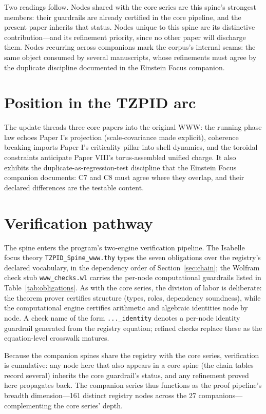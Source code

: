 \documentclass[11pt]{article}
\theoremstyle{remark}
\begin{document}
Two readings follow. Nodes shared with the core series are this spine's strongest members: their guardrails are already certified in the core pipeline, and the present paper inherits that status. Nodes unique to this spine are its distinctive contribution---and its refinement priority, since no other paper will discharge them. Nodes recurring across companions mark the corpus's internal seams: the same object consumed by several manuscripts, whose refinements must agree by the duplicate discipline documented in the Einstein Focus companion.

\section{Position in the TZPID arc}
\label{sec:arc}

The update threads three core papers into the original WWW: the running phase law echoes Paper I's projection (scale-covariance made explicit), coherence breaking imports Paper I's criticality pillar into shell dynamics, and the toroidal constraints anticipate Paper VIII's torus-assembled unified charge. It also exhibits the duplicate-as-regression-test discipline that the Einstein Focus companion documents: C7 and C8 must agree where they overlap, and their declared differences are the testable content.

\section{Verification pathway}
\label{sec:verify}

The spine enters the program's two-engine verification pipeline. The Isabelle focus theory \texttt{TZPID\_Spine\_www.thy} types the seven obligations over the registry's declared vocabulary, in the dependency order of Section~\ref{sec:chain}; the Wolfram check stub \texttt{www\_checks.wl} carries the per-node computational guardrails listed in Table~\ref{tab:obligations}. As with the core series, the division of labor is deliberate: the theorem prover certifies structure (types, roles, dependency soundness), while the computational engine certifies arithmetic and algebraic identities node by node. A check name of the form \texttt{...\_identity} denotes a per-node identity guardrail generated from the registry equation; refined checks replace these as the equation-level crosswalk matures.

Because the companion spines share the registry with the core series, verification is cumulative: any node here that also appears in a core spine (the chain tables record several) inherits the core guardrail's status, and any refinement proved here propagates back. The companion series thus functions as the proof pipeline's breadth dimension---161 distinct registry nodes across the 27 companions---complementing the core series' depth.
\end{document}
